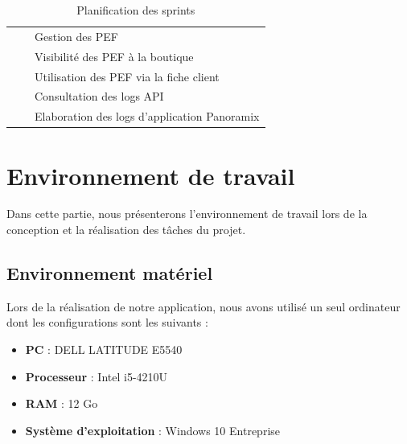 \begin{table}[H]
\begin{tabular}{|l|l|l|}
		&                           & Gestion des PEF                              \\ \cline{3-3} 
		&                           & Visibilité des PEF à la boutique             \\ \cline{3-3} 
		&                           & Utilisation des PEF via la fiche client      \\ \cline{3-3} 
		&                           & Consultation des logs API                    \\ \cline{3-3} 
		&                           & Elaboration des logs d’application Panoramix \\ \hline
	\end{tabular}
	\captionsetup{justification=centering}
	\caption{Planification des sprints}
	\label{tab:plan-sprints}
\end{table}
\section[Environnement de travail]{Environnement de travail}
Dans cette partie, nous présenterons l’environnement de travail lors de la conception et la réalisation des tâches du projet.
\subsection[Environnement matériel]{Environnement matériel}
Lors de la réalisation de notre application, nous avons utilisé un seul ordinateur dont les configurations sont les suivants :
\begin{itemize}
	\item \textbf{PC} : DELL LATITUDE E5540
	\item \textbf{Processeur} : Intel i5-4210U
	\item \textbf{RAM} : 12 Go
	\item \textbf{Système d’exploitation} : Windows 10 Entreprise	
\end{itemize}
